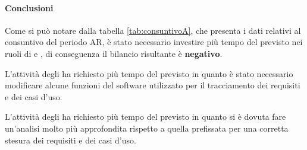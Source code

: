 \documentclass[./PianoDiProgetto.tex]{subfiles}
\begin{document}
  \paragraph{Conclusioni}
		Come si può notare dalla tabella \ref{tab:consuntivoA}, che presenta i dati relativi al consuntivo del periodo AR, è stato necessario investire più tempo del previsto nei ruoli di  \AMM{} e \AN, di conseguenza il bilancio risultante è \textbf{negativo}.
		
		L'attività degli \AMMP{} ha richiesto più tempo del previsto in quanto è stato necessario modificare alcune funzioni del software utilizzato per il tracciamento dei requisiti e dei casi d'uso.
		
		L'attività degli \ANP{} ha richiesto più tempo del previsto in quanto si è dovuta fare un'analisi molto più approfondita rispetto a quella prefissata per una corretta stesura dei requisiti e dei casi d'uso.
\end{document}
